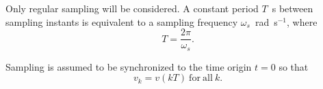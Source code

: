 Only regular sampling will be considered. A constant period $T$~s
between sampling instants is equivalent to a sampling frequency
$\omega_s$~rad~s$^{-1}$, where \[ T = \frac{2\pi}{\omega_s}. \]

Sampling is assumed to be synchronized to the time origin $t=0$ so
that \[ v_k = v(kT)\ \mathrm{for\ all }\ k.\]
\endinput

